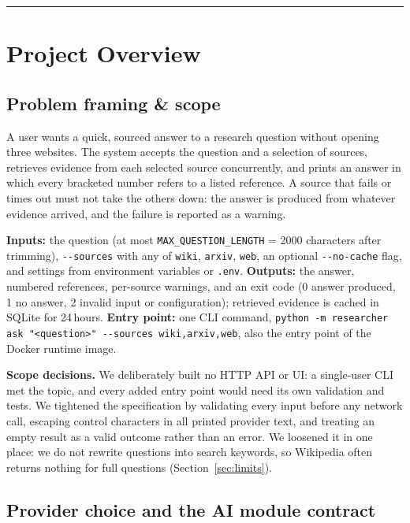 \documentclass[11pt,a4paper]{article}
\newcommand{\cmd}[1]{\texttt{#1}}
\begin{document}
\tableofcontents
\vspace{0.6em}\hrule\vspace{0.4em}

\section{Project Overview}

\subsection{Problem framing \& scope}

A user wants a quick, sourced answer to a research question without opening
three websites. The system accepts the question and a selection of sources,
retrieves evidence from each selected source concurrently, and prints an answer
in which every bracketed number refers to a listed reference. A source that
fails or times out must not take the others down: the answer is produced from
whatever evidence arrived, and the failure is reported as a warning.

\textbf{Inputs:} the question (at most \cmd{MAX\_QUESTION\_LENGTH} = 2000
characters after trimming), \cmd{-{}-sources} with any of \cmd{wiki},
\cmd{arxiv}, \cmd{web}, an optional \cmd{-{}-no-cache} flag, and settings from
environment variables or \cmd{.env}. \textbf{Outputs:} the answer, numbered
references, per-source warnings, and an exit code (0 answer produced, 1 no
answer, 2 invalid input or configuration); retrieved evidence is cached in
SQLite for 24\,hours. \textbf{Entry point:} one CLI command,
\cmd{python -m researcher ask "<question>" -{}-sources wiki,arxiv,web}, also the
entry point of the Docker runtime image.

\textbf{Scope decisions.} We deliberately built no HTTP API or UI: a single-user
CLI met the topic, and every added entry point would need its own validation and
tests. We tightened the specification by validating every input before any
network call, escaping control characters in all printed provider text, and
treating an empty result as a valid outcome rather than an error. We loosened it
in one place: we do not rewrite questions into search keywords, so Wikipedia
often returns nothing for full questions (Section~\ref{sec:limits}).

\subsection{Provider choice and the AI module contract}
\end{document}
